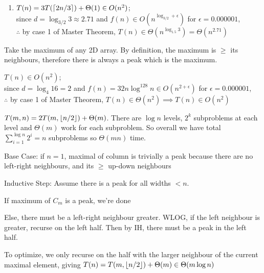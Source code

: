 \documentclass[12pt, a4paper]{article}
\begin{document}
\begin{enumerate}[Q\arabic*).]
\begin{enumerate}[(\alph*)]
      \item $T(n) = 3T(\lceil 2n /3 \rceil) + \Theta(1) \in O(n^2)$;\\since $d = \log_{3/2}{3} \approx 2.71$ and $f(n) \in O(n^{\log_{3 /2}+\epsilon})$ for $\epsilon = 0.000001$,\\$\therefore$ by case 1 of Master Theorem, $T(n) \in \Theta(n^{\log_{1.5}3}) = \Theta(n^{2.71})$
    \end{enumerate}

  \item Take the maximum of any 2D array. By definition, the maximum is $\geq$ its neighbours, therefore there is always a peak which is the maximum.

  \item $T(n) \in O(n^2)$;\\since $d = \log_4{16} = 2$ and $f(n) = 32n\log^{128}n \in O(n^{2+ \epsilon})$ for $\epsilon = 0.000001$,\\$\therefore$ by case 1 of Master Theorem, $T(n) \in \Theta(n^2) \implies T(n) \in O(n^2)$

  \item $T(m, n) = 2T(m, \lfloor n /2 \rfloor) + \Theta(m)$. There are $\log n$ levels, $2^k$ subproblems at each level and $\Theta(m)$ work for each subproblem. So overall we have total $\sum^{\log n}_{i=1}2^i = n$ subproblems so $\Theta(mn)$ time. 

  \item 
    \begin{enumproof}
    \item Base Case: if $n = 1$, maximal of column is trivially a peak because there are no left-right neighbours, and its $\geq$ up-down neighbours  
    \item Inductive Step: Assume there is a peak for all widths $< n$.
      \begin{enumproof}
      \item If maximum of $C_m$ is a peak, we're done
      \item Else, there must be a left-right neighbour greater. WLOG, if the left neighbour is greater, recurse on the left half. Then by IH, there must be a peak in the left half.
      \end{enumproof}
    \end{enumproof}
    To optimize, we only recurse on the half with the larger neighbour of the current maximal element, giving $T(n) = T(m, \lfloor n /2 \rfloor) + \Theta(m) \in \Theta(m\log n)$ 

\end{enumerate}
\end{document}
